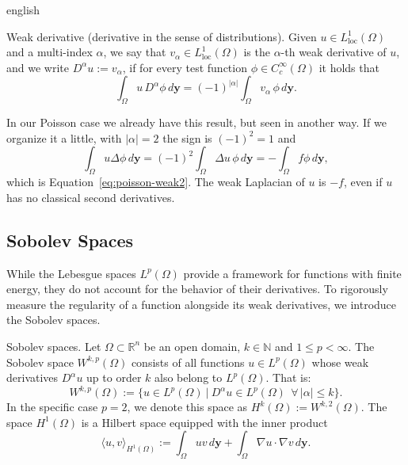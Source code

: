 \documentclass[12pt,letterpaper,twoside]{book}
\newcommand{\abs}[1]{\left\lvert #1 \right\rvert}
\begin{document}
\begin{hyphenrules}{english}
\begin{definicion}{Weak derivative (derivative in the sense of distributions).}\label{def:weak-derivative}
Given $u\in L^1_{\mathrm{loc}}(\Omega)$ and a multi-index $\alpha$, we say that
$v_\alpha\in L^1_{\mathrm{loc}}(\Omega)$ is the $\alpha$-th weak derivative of $u$, and we write
$D^\alpha u:=v_\alpha$, if for every test function $\phi\in C_c^\infty(\Omega)$ it holds that
\cite{reyna_sobolev}
\begin{equation}
  \int_\Omega u\,D^\alpha\phi\,d\mathbf{y}=(-1)^{\abs{\alpha}}\int_\Omega v_\alpha\,\phi\,d\mathbf{y}.
  \label{eq:weak-derivative}
\end{equation}
\end{definicion}

In our Poisson case we already have this result, but seen in another way. If we organize it a little,
with $\abs{\alpha}=2$ the sign is $(-1)^2=1$ and
\begin{equation}
  \int_\Omega u\Delta\phi\,d\mathbf{y}=(-1)^2\int_\Omega\Delta u\,\phi\,d\mathbf{y}=-\int_\Omega f\phi\,d\mathbf{y},
  \label{eq:weak-poisson-again}
\end{equation}
which is Equation~\eqref{eq:poisson-weak2}. The weak Laplacian of $u$ is $-f$, even if $u$ has no classical second
derivatives.

\subsection{Sobolev Spaces}\label{subsec:sobolev}

While the Lebesgue spaces $L^p(\Omega)$ provide a framework for functions with finite energy, they do
not account for the behavior of their derivatives. To rigorously measure the regularity of a function
alongside its weak derivatives, we introduce the Sobolev spaces.

\begin{definicion}{Sobolev spaces.}\label{def:sobolev}
Let $\Omega\subset\mathbb{R}^n$ be an open domain, $k\in\mathbb{N}$ and $1\le p<\infty$. The Sobolev space
$W^{k,p}(\Omega)$ consists of all functions $u\in L^p(\Omega)$ whose weak derivatives $D^\alpha u$ up to
order $k$ also belong to $L^p(\Omega)$. That is:
\begin{equation}
  W^{k,p}(\Omega):=\big\{u\in L^p(\Omega)\ \big|\ D^\alpha u\in L^p(\Omega)\ \ \forall\,\abs{\alpha}\le k\big\}.
  \label{eq:sobolev}
\end{equation}
In the specific case $p=2$, we denote this space as $H^k(\Omega):=W^{k,2}(\Omega)$. The space
$H^1(\Omega)$ is a Hilbert space equipped with the inner product
\begin{equation}
  \langle u,v\rangle_{H^1(\Omega)}:=\int_\Omega uv\,d\mathbf{y}+\int_\Omega\nabla u\cdot\nabla v\,d\mathbf{y}.
  \label{eq:h1-inner}
\end{equation}
\end{definicion}


\end{hyphenrules}
\end{document}
